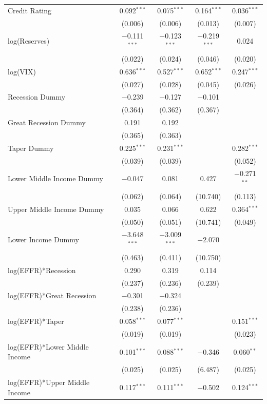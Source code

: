 \documentclass[12pt]{article}
\begin{document}
\begin{table}[h!]
\begin{tabular}{@{\extracolsep{5pt}}lcccc}
  Credit Rating & 0.092$^{***}$ & 0.075$^{***}$ & 0.164$^{***}$ & 0.036$^{***}$ \\ 
  & (0.006) & (0.006) & (0.013) & (0.007) \\ 
  log(Reserves) & $-$0.111$^{***}$ & $-$0.123$^{***}$ & $-$0.219$^{***}$ & 0.024 \\ 
  & (0.022) & (0.024) & (0.046) & (0.020) \\ 
  log(VIX) & 0.636$^{***}$ & 0.527$^{***}$ & 0.652$^{***}$ & 0.247$^{***}$ \\ 
  & (0.027) & (0.028) & (0.045) & (0.026) \\ 
  Recession Dummy & $-$0.239 & $-$0.127 & $-$0.101 &  \\ 
  & (0.364) & (0.362) & (0.367) &  \\ 
  Great Recession Dummy & 0.191 & 0.192 &  &  \\ 
  & (0.365) & (0.363) &  &  \\ 
  Taper Dummy & 0.225$^{***}$ & 0.231$^{***}$ &  & 0.282$^{***}$ \\ 
  & (0.039) & (0.039) &  & (0.052) \\ 
  Lower Middle Income Dummy & $-$0.047 & 0.081 & 0.427 & $-$0.271$^{**}$ \\ 
  & (0.062) & (0.064) & (10.740) & (0.113) \\ 
  Upper Middle Income Dummy & 0.035 & 0.066 & 0.622 & 0.364$^{***}$ \\ 
  & (0.050) & (0.051) & (10.741) & (0.049) \\ 
  Lower Income Dummy & $-$3.648$^{***}$ & $-$3.009$^{***}$ & $-$2.070 &  \\ 
  & (0.463) & (0.411) & (10.750) &  \\ 
  log(EFFR)*Recession & 0.290 & 0.319 & 0.114 &  \\ 
  & (0.237) & (0.236) & (0.239) &  \\ 
  log(EFFR)*Great Recession & $-$0.301 & $-$0.324 &  &  \\ 
  & (0.238) & (0.236) &  &  \\ 
  log(EFFR)*Taper & 0.058$^{***}$ & 0.077$^{***}$ &  & 0.151$^{***}$ \\ 
  & (0.019) & (0.019) &  & (0.023) \\ 
  log(EFFR)*Lower Middle Income & 0.101$^{***}$ & 0.088$^{***}$ & $-$0.346 & 0.060$^{**}$ \\ 
  & (0.025) & (0.025) & (6.487) & (0.025) \\ 
  log(EFFR)*Upper Middle Income & 0.117$^{***}$ & 0.111$^{***}$ & $-$0.502 & 0.124$^{***}$ \\ 

\end{tabular}
\end{table}
\end{document}
